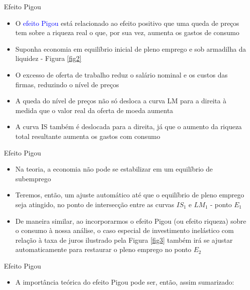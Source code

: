 \documentclass[10pt]{beamer}
\begin{document}
\begin{frame}{Efeito Pigou}
    \begin{itemize}
        \item O \textcolor{blue}{efeito Pigou} está relacionado ao efeito positivo que uma queda de preços tem sobre a riqueza real o que, por sua vez, aumenta os gastos de consumo
        \bigskip
        \item Suponha economia em equilíbrio inicial de pleno emprego e sob armadilha da liquidez - Figura \ref{fig2}
        \bigskip
        \item O excesso de oferta de trabalho reduz o salário nominal e os custos das firmas, reduzindo o nível de preços
        \bigskip
        \item A queda do nível de preços não só desloca a curva LM para a direita à medida que o valor real da oferta de moeda aumenta
        \bigskip
        \item A curva IS também é deslocada para a direita, já que o aumento da riqueza total resultante aumenta os gastos com consumo
    \end{itemize}
\end{frame}

\begin{frame}{Efeito Pigou}
    \begin{itemize}
        \item Na teoria, a economia não pode se estabilizar em um equilíbrio de subemprego
        \bigskip
        \item Teremos, então, um ajuste automático até que o equilíbrio de pleno emprego seja atingido, no ponto de intersecção entre as curvas $IS_1$ e $LM_1$ - ponto $E_1$
        \bigskip
        \item De maneira similar, ao incorporarmos o efeito Pigou (ou efeito riqueza) sobre o consumo à nossa análise, o caso especial de investimento inelástico com relação à taxa de juros ilustrado pela Figura \ref{fig3} também irá se ajustar automaticamente para restaurar o pleno emprego no ponto $E_2$
    \end{itemize}
\end{frame}

\begin{frame}{Efeito Pigou}
    \begin{itemize}
        \item A importância teórica do efeito Pigou pode ser, então, assim sumarizado:        \bigskip
        \begin{flushright}
        \end{flushright}
    \end{itemize}
\end{frame}
\end{document}
